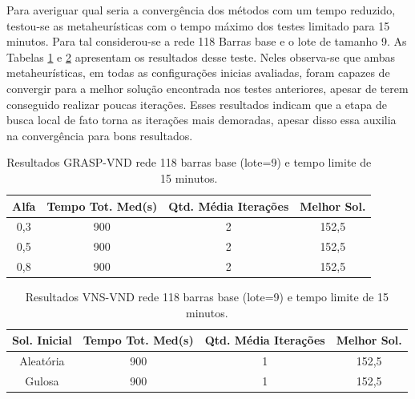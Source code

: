 \documentclass[12pt]{article}
\begin{document}
Para averiguar qual seria a convergência dos métodos com um tempo reduzido, testou-se as metaheurísticas com o tempo máximo dos testes limitado para 15 minutos. Para tal considerou-se a rede 118 Barras base e o lote de tamanho 9. As Tabelas \ref{tab22} e \ref{tab23} apresentam os resultados desse teste. Neles observa-se que ambas metaheurísticas, em todas as configurações inicias avaliadas, foram capazes de convergir para a melhor solução encontrada nos testes anteriores, apesar de terem conseguido realizar poucas iterações. Esses resultados indicam que a etapa de busca local de fato torna as iterações mais demoradas, apesar disso essa auxilia na convergência para bons resultados.

\begin{table}[H]
	\centering
	\caption{Resultados GRASP-VND rede 118 barras base (lote=9) e tempo limite de 15 minutos.}
	\begin{tabular}{|c|c|c|c|}
		\hline
		\textbf{Alfa} & \textbf{Tempo Tot. Med(s)} & \textbf{Qtd. Média Iterações} & \textbf{Melhor Sol.} \\
		\hline
		0,3   & 900   & 2     & 152,5 \\
		\hline
		0,5   & 900   & 2     & 152,5 \\
		\hline
		0,8   & 900   & 2     & 152,5 \\
		\hline
	\end{tabular}%
	\label{tab22}%
\end{table}%

\begin{table}[H]
	\centering
	\caption{Resultados VNS-VND rede 118 barras base (lote=9) e tempo limite de 15 minutos.}
	\begin{tabular}{|c|c|c|c|}
		\hline
		\textbf{Sol. Inicial} & \textbf{Tempo Tot. Med(s)} & \textbf{Qtd. Média Iterações} & \textbf{Melhor Sol. } \\
		\hline
		Aleatória & 900   & 1     & 152,5 \\
		\hline
		Gulosa & 900   & 1     & 152,5 \\
		\hline
	\end{tabular}%
	\label{tab23}%
\end{table}%


 
\end{document}

